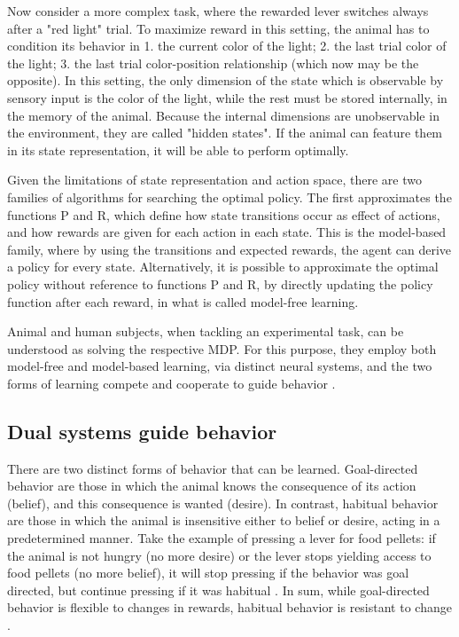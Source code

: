         Now consider a more complex task, where the rewarded lever switches always after a "red light" trial. To maximize reward in this setting, the animal has to condition its behavior in 1. the current color of the light; 2. the last trial color of the light; 3. the last trial color-position relationship (which now may be the opposite). In this setting, the only dimension of the state which is observable by sensory input is the color of the light, while the rest must be stored internally, in the memory of the animal. Because the internal dimensions are unobservable in the environment, they are called "hidden states". If the animal can feature them in its state representation, it will be able to perform optimally.
        
        Given the limitations of state representation and action space, there are two families of algorithms for searching the optimal policy. The first approximates the functions P and R, which define how state transitions occur as effect of actions, and how rewards are given for each action in each state. This is the model-based family, where by using the transitions and expected rewards, the agent can derive a policy for every state. Alternatively, it is possible to approximate the optimal policy without reference to functions P and R, by directly updating the policy function after each reward, in what is called model-free learning.
        
        Animal and human subjects, when tackling an experimental task, can be understood as solving the respective MDP. For this purpose, they employ both model-free and model-based learning, via distinct neural systems, and the two forms of learning compete and cooperate to guide behavior \cite{kool2018competition}. 
        
    \subsection{Dual systems guide behavior}
        There are two distinct forms of behavior that can be learned. Goal-directed behavior are those in which the animal knows the consequence of its action (belief), and this consequence is wanted (desire). In contrast, habitual behavior are those in which the animal is insensitive either to belief or desire, acting in a predetermined manner. Take the example of pressing a lever for food pellets: if the animal is not hungry (no more desire) or the lever stops yielding access to food pellets (no more belief), it will stop pressing if the behavior was goal directed, but continue pressing if it was habitual \cite{}. In sum, while goal-directed behavior is flexible to changes in rewards, habitual behavior is resistant to change \cite{}.
        
